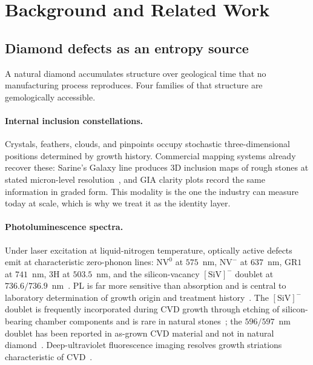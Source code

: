 \documentclass[10pt,twocolumn]{article}
\theoremstyle{remark}
\begin{document}
\section{Background and Related Work}
\label{sec:bg}

\subsection{Diamond defects as an entropy source}

A natural diamond accumulates structure over geological time that no
manufacturing process reproduces. Four families of that structure are
gemologically accessible.

\paragraph{Internal inclusion constellations.} Crystals, feathers, clouds, and
pinpoints occupy stochastic three-dimensional positions determined by growth
history. Commercial mapping systems already recover these: Sarine's Galaxy line
produces 3D inclusion maps of rough stones at stated micron-level
resolution~\cite{sarine_galaxy,sarine_tech}, and GIA clarity plots record the
same information in graded form. This modality is the one the industry can
measure today at scale, which is why we treat it as the identity layer.

\paragraph{Photoluminescence spectra.} Under laser excitation at liquid-nitrogen
temperature, optically active defects emit at characteristic zero-phonon lines:
$\mathrm{NV}^{0}$ at $575$~nm, $\mathrm{NV}^{-}$ at $637$~nm, $\mathrm{GR1}$ at
$741$~nm, $3\mathrm{H}$ at $503.5$~nm, and the silicon-vacancy
$[\mathrm{SiV}]^{-}$ doublet at $736.6/736.9$~nm~\cite{gia_pl2016,zaitsev2001}.
PL is far more sensitive than absorption and is central to laboratory
determination of growth origin and treatment
history~\cite{gia_pl2016,gia_pl2024}. The $[\mathrm{SiV}]^{-}$ doublet is
frequently incorporated during CVD growth through etching of silicon-bearing
chamber components and is rare in natural stones~\cite{gia_si2013,breeding2008};
the $596/597$~nm doublet has been reported in as-grown CVD material and not in
natural diamond~\cite{gia_cvd2016,martineau2004}. Deep-ultraviolet fluorescence
imaging resolves growth striations characteristic of CVD~\cite{gia_cvd2023}.
\end{document}
